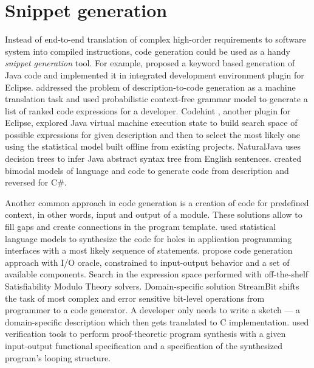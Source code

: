 \section{Snippet generation}
Instead of end-to-end translation of complex high-order requirements to software system into compiled instructions, code generation could be used as a handy \emph{snippet generation} tool. For example, \cite{little2009keyword} proposed a keyword based generation of Java code and implemented it in integrated development environment plugin for Eclipse. \cite{Gvero2015} addressed the problem of description-to-code generation as a machine translation task and used probabilistic context-free grammar model to generate a list of ranked code expressions for a developer. Codehint \parencite{Galenson2014}, another plugin for Eclipse, explored Java virtual machine execution state to build search space of possible expressions for given description and then to select the most likely one using the statistical model built offline from existing projects. NaturalJava \parencite{Price2000} uses decision trees to infer Java abstract syntax tree from English sentences. \cite{pmlr-v37-allamanis15} created bimodal models of language and code to generate code from description and reversed for C\#.

Another common approach in code generation is a creation of code for predefined context, in other words, input and output of a module. These solutions allow to fill gaps and create connections in the program template. \cite{Raychev2014} used statistical language models to synthesize the code for holes in application programming interfaces with a most likely sequence of statements. \cite{Jha2010} propose code generation approach with I/O oracle, constrained to input-output behavior and a set of available components. Search in the expression space performed with off-the-shelf Satisfiability Modulo Theory solvers. Domain-specific solution StreamBit \parencite{Solar-Lezama2005} shifts the task of most complex and error sensitive bit-level operations from programmer to a code generator. A developer only needs to write a sketch --- a domain-specific description which then gets translated to C implementation. \cite{Srivastava2010} used verification tools to perform proof-theoretic program synthesis with a given input-output functional specification and a specification of the synthesized program’s looping structure.

